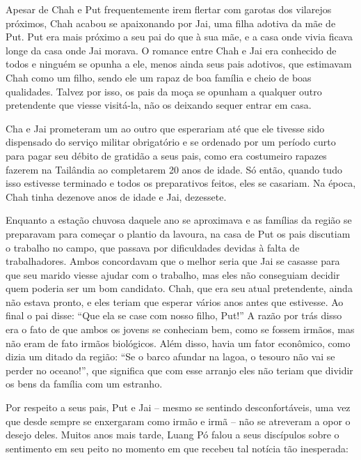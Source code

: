 Apesar de Chah e Put frequentemente irem flertar com garotas dos
vilarejos próximos, Chah acabou se apaixonando por Jai, uma filha
adotiva da mãe de Put. Put era mais próximo a seu pai do que à sua mãe,
e a casa onde vivia ficava longe da casa onde Jai morava. O romance
entre Chah e Jai era conhecido de todos e ninguém se opunha a ele, menos
ainda seus pais adotivos, que estimavam Chah como um filho, sendo ele um
rapaz de boa família e cheio de boas qualidades. Talvez por isso, os
pais da moça se opunham a qualquer outro pretendente que viesse
visitá-la, não os deixando sequer entrar em casa.

Cha e Jai prometeram um ao outro que esperariam até que ele tivesse sido
dispensado do serviço militar obrigatório e se ordenado por um período
curto para pagar seu débito de gratidão a seus pais, como era costumeiro
rapazes fazerem na Tailândia ao completarem 20 anos de idade. Só então,
quando tudo isso estivesse terminado e todos os preparativos feitos,
eles se casariam. Na época, Chah tinha dezenove anos de idade e Jai,
dezessete.

Enquanto a estação chuvosa daquele ano se aproximava e as famílias da
região se preparavam para começar o plantio da lavoura, na casa de Put
os pais discutiam o trabalho no campo, que passava por dificuldades
devidas à falta de trabalhadores. Ambos concordavam que o melhor seria
que Jai se casasse para que seu marido viesse ajudar com o trabalho, mas
eles não conseguiam decidir quem poderia ser um bom candidato. Chah, que
era seu atual pretendente, ainda não estava pronto, e eles teriam que
esperar vários anos antes que estivesse. Ao final o pai disse: ``Que ela
se case com nosso filho, Put!'' A razão por trás disso era o fato de que
ambos os jovens se conheciam bem, como se fossem irmãos, mas não eram de
fato irmãos biológicos. Além disso, havia um fator econômico, como dizia
um ditado da região: ``Se o barco afundar na lagoa, o tesouro não vai se
perder no oceano!'', que significa que com esse arranjo eles não teriam
que dividir os bens da família com um estranho.

Por respeito a seus pais, Put e Jai -- mesmo se sentindo
desconfortáveis, uma vez que desde sempre se enxergaram como irmão e
irmã -- não se atreveram a opor o desejo deles. Muitos anos mais tarde,
Luang Pó falou a seus discípulos sobre o sentimento em seu peito no
momento em que recebeu tal notícia tão inesperada:

